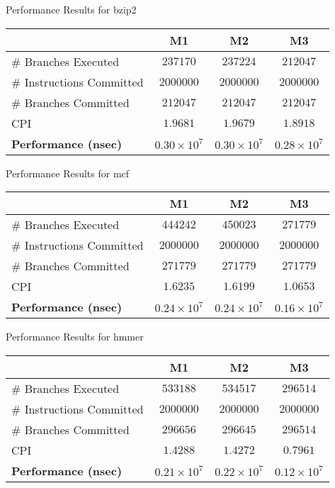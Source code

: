 \documentclass[10pt]{article} %
\begin{document}
\begin{enumerate}
\begin{center}
Performance Results for bzip2

\begin{tabular}{|l|c|c|c|}
\hline
 & M1 & M2 & M3 \\
\hline
\# Branches Executed & $237170$ & $237224$ & $212047$ \\
\# Instructions Committed & $2000000$ & $2000000$ & $2000000$ \\
\# Branches Committed & $212047$ & $212047$ & $212047$ \\
CPI & $1.9681$ & $1.9679$ & $1.8918$ \\
\hline
\textbf{Performance (nsec)} & $0.30 \times 10^{7}$ & $0.30 \times 10^{7}$ & $0.28 \times 10^{7}$ \\
\hline
\end{tabular}
\end{center}

\begin{center}
Performance Results for mcf

\begin{tabular}{|l|c|c|c|}
\hline
 & M1 & M2 & M3 \\
\hline
\# Branches Executed & $444242$ & $450023$ & $271779$ \\
\# Instructions Committed & $2000000$ & $2000000$ & $2000000$ \\
\# Branches Committed & $271779$ & $271779$ & $271779$ \\
CPI & $1.6235$ & $1.6199$ & $1.0653$ \\
\hline
\textbf{Performance (nsec)} & $0.24 \times 10^{7}$ & $0.24 \times 10^{7}$ & $0.16 \times 10^{7}$ \\
\hline
\end{tabular}
\end{center}

\begin{center}
Performance Results for hmmer

\begin{tabular}{|l|c|c|c|}
\hline
 & M1 & M2 & M3 \\
\hline
\# Branches Executed & $533188$ & $534517$ & $296514$ \\
\# Instructions Committed & $2000000$ & $2000000$ & $2000000$ \\
\# Branches Committed & $296656$ & $296645$ & $296514$ \\
CPI & $1.4288$ & $1.4272$ & $0.7961$ \\
\hline
\textbf{Performance (nsec)} & $0.21 \times 10^{7}$ & $0.22 \times 10^{7}$ & $0.12 \times 10^{7}$ \\
\hline
\end{tabular}
\end{center}


\end{enumerate}
\end{document}
